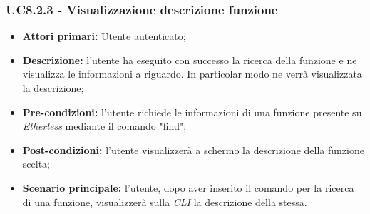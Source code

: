 \subsubsection{UC8.2.3 - Visualizzazione descrizione funzione}
\begin{itemize}
	\item \textbf{Attori primari:} Utente autenticato;
	\item \textbf{Descrizione:} l'utente ha eseguito con successo la ricerca della funzione e ne visualizza le informazioni a riguardo. In particolar modo ne verrà visualizzata la descrizione; 
	\item \textbf{Pre-condizioni:} l'utente richiede le informazioni di una funzione presente su \textit{Etherless} mediante il comando "find"; 
	\item \textbf{Post-condizioni:} l'utente visualizzerà a schermo la descrizione della funzione scelta;
	\item \textbf{Scenario principale:} l'utente, dopo aver inserito il comando per la ricerca di una funzione, visualizzerà sulla \textit{CLI\glo} la descrizione della stessa.
\end{itemize}